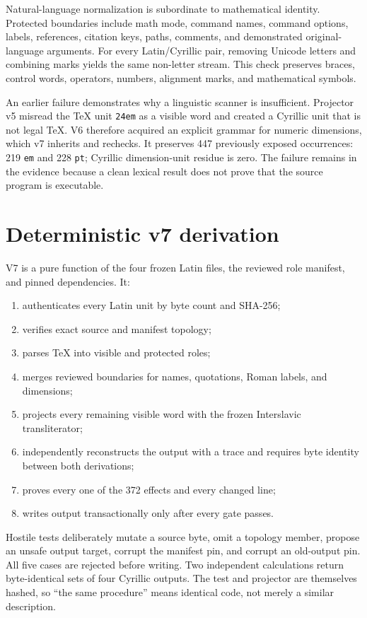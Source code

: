 \documentclass[11pt]{article}
\newcommand{\code}[1]{\texttt{#1}}
\begin{document}
Natural-language normalization is subordinate to mathematical identity. Protected boundaries include math mode, command names, command options, labels, references, citation keys, paths, comments, and demonstrated original-language arguments. For every Latin/Cyrillic pair, removing Unicode letters and combining marks yields the same non-letter stream. This check preserves braces, control words, operators, numbers, alignment marks, and mathematical symbols.

An earlier failure demonstrates why a linguistic scanner is insufficient. Projector v5 misread the TeX unit \code{24em} as a visible word and created a Cyrillic unit that is not legal TeX. V6 therefore acquired an explicit grammar for numeric dimensions, which v7 inherits and rechecks. It preserves 447 previously exposed occurrences: 219 \code{em} and 228 \code{pt}; Cyrillic dimension-unit residue is zero. The failure remains in the evidence because a clean lexical result does not prove that the source program is executable.

\section{Deterministic v7 derivation}

V7 is a pure function of the four frozen Latin files, the reviewed role manifest, and pinned dependencies. It:

\begin{enumerate}
\item authenticates every Latin unit by byte count and SHA-256;
\item verifies exact source and manifest topology;
\item parses TeX into visible and protected roles;
\item merges reviewed boundaries for names, quotations, Roman labels, and dimensions;
\item projects every remaining visible word with the frozen Interslavic transliterator;
\item independently reconstructs the output with a trace and requires byte identity between both derivations;
\item proves every one of the 372 effects and every changed line;
\item writes output transactionally only after every gate passes.
\end{enumerate}

Hostile tests deliberately mutate a source byte, omit a topology member, propose an unsafe output target, corrupt the manifest pin, and corrupt an old-output pin. All five cases are rejected before writing. Two independent calculations return byte-identical sets of four Cyrillic outputs. The test and projector are themselves hashed, so ``the same procedure'' means identical code, not merely a similar description.
\end{document}
